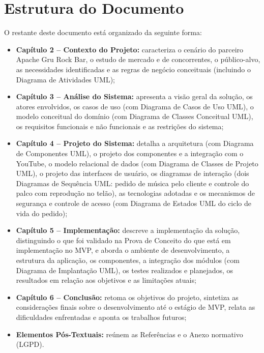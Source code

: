 \section{Estrutura do Documento}

O restante deste documento está organizado da seguinte forma:

\begin{itemize}
  \item \textbf{Capítulo 2 -- Contexto do Projeto:} caracteriza o cenário do parceiro Apache Gru Rock Bar, o estudo de mercado e de concorrentes, o público-alvo, as necessidades identificadas e as regras de negócio conceituais (incluindo o Diagrama de Atividades UML);
  \item \textbf{Capítulo 3 -- Análise do Sistema:} apresenta a visão geral da solução, os atores envolvidos, os casos de uso (com Diagrama de Casos de Uso UML), o modelo conceitual do domínio (com Diagrama de Classes Conceitual UML), os requisitos funcionais e não funcionais e as restrições do sistema;
  \item \textbf{Capítulo 4 -- Projeto do Sistema:} detalha a arquitetura (com Diagrama de Componentes UML), o projeto dos componentes e a integração com o YouTube, o modelo relacional de dados (com Diagrama de Classes de Projeto UML), o projeto das interfaces de usuário, os diagramas de interação (dois Diagramas de Sequência UML: pedido de música pelo cliente e controle do palco com reprodução no telão), as tecnologias adotadas e os mecanismos de segurança e controle de acesso (com Diagrama de Estados UML do ciclo de vida do pedido);
  \item \textbf{Capítulo 5 -- Implementação:} descreve a implementação da solução, distinguindo o que foi validado na Prova de Conceito do que está em implementação no MVP, e aborda o ambiente de desenvolvimento, a estrutura da aplicação, os componentes, a integração dos módulos (com Diagrama de Implantação UML), os testes realizados e planejados, os resultados em relação aos objetivos e as limitações atuais;
  \item \textbf{Capítulo 6 -- Conclusão:} retoma os objetivos do projeto, sintetiza as considerações finais sobre o desenvolvimento até o estágio de MVP, relata as dificuldades enfrentadas e aponta os trabalhos futuros;
  \item \textbf{Elementos Pós-Textuais:} reúnem as Referências e o Anexo normativo (LGPD).
\end{itemize}


